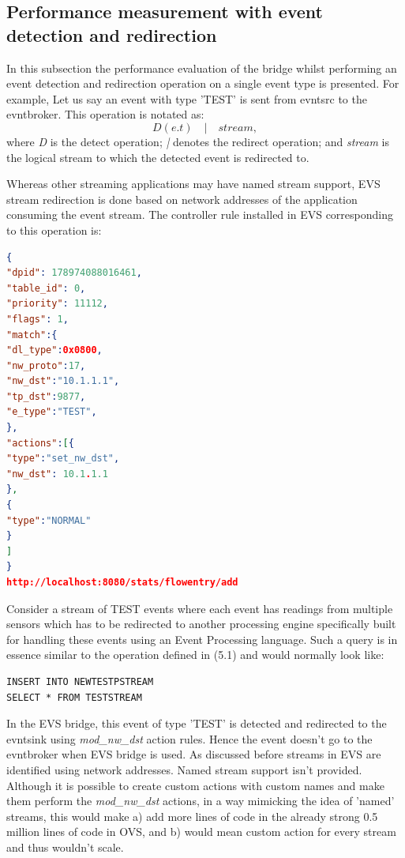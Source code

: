 \subsection{Performance measurement with event detection and redirection}
In this subsection the performance evaluation of the bridge whilst performing an event detection and redirection operation on a single event type is presented.  For example, Let us say an event with type 'TEST' is sent from evntsrc to the evntbroker. 
This operation is notated as: \begin{equation} D(e.t) \quad | \quad stream,  \end{equation}
where \textit{D} is the detect operation; \newline
\textit{|} denotes the redirect operation; \newline
and \textit{stream} is the logical stream to which the detected event is redirected to. \newline \newline

Whereas other streaming applications may have named stream support, EVS stream redirection is done based on network addresses of the application consuming the event stream. The controller rule installed in EVS corresponding to this operation is:

\begin{lstlisting}[language=json,firstnumber=1]
{
"dpid": 178974088016461,
"table_id": 0,
"priority": 11112,
"flags": 1,
"match":{
"dl_type":0x0800,
"nw_proto":17,
"nw_dst":"10.1.1.1",
"tp_dst":9877,
"e_type":"TEST",
},
"actions":[{
"type":"set_nw_dst",
"nw_dst": 10.1.1.1
},
{
"type":"NORMAL"
}
]
}
http://localhost:8080/stats/flowentry/add \end{lstlisting}

Consider a stream of TEST events where each event has readings from multiple sensors which has to be redirected to another processing engine specifically built for handling these events using an Event Processing language. Such a query is in essence similar to the operation defined in (5.1) and would normally look like:

\begin{verbatim}
INSERT INTO NEWTESTPSTREAM
SELECT * FROM TESTSTREAM
\end{verbatim}

In the EVS bridge, this event of type 'TEST' is detected and redirected to the evntsink using \textit{mod_nw_dst} action rules. Hence the event doesn't go to the evntbroker when EVS bridge is used. As discussed before streams in EVS are identified using network addresses. Named stream support isn't provided. Although it is possible to create custom actions with custom names and make them perform the \textit{mod_nw_dst} actions, in a way mimicking the idea of 'named' streams, this would make a) add more lines of code in the already strong 0.5 million lines of code in OVS, and b) would mean custom action for every stream and thus wouldn't scale.


